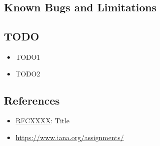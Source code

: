 \documentclass[documentation]{subfiles}
\begin{document}
\subsection{Known Bugs and Limitations}

\subsection{TODO}
\begin{itemize}
    \item TODO1
    \item TODO2
\end{itemize}

\subsection{References}
\begin{itemize}
    \item \href{https://tools.ietf.org/html/rfcXXXX}{RFCXXXX}: Title
    \item \url{https://www.iana.org/assignments/}
\end{itemize}
\end{document}
